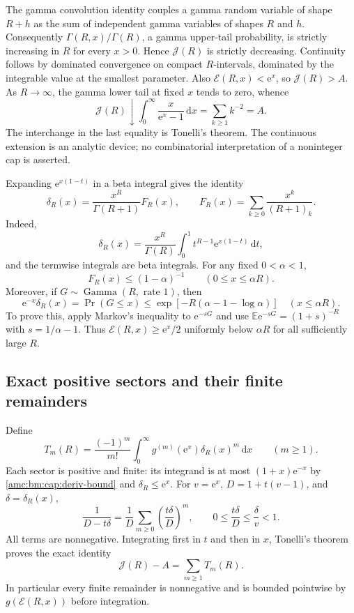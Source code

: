 \documentclass[11pt,letterpaper]{article}
\theoremstyle{remark}\newtheorem{remark}[theorem]{Remark}
\newcommand{\ee}{\mathrm e}
\newcommand{\dd}{\,\mathrm d}
\DeclareMathOperator{\GammaDist}{Gamma}
\begin{document}
The gamma convolution identity couples a gamma random variable of shape $R+h$ as the sum of independent gamma variables of shapes $R$ and $h$. Consequently $\Gamma(R,x)/\Gamma(R)$, a gamma upper-tail probability, is strictly increasing in $R$ for every $x>0$. Hence $\mathcal J(R)$ is strictly decreasing. Continuity follows by dominated convergence on compact $R$-intervals, dominated by the integrable value at the smallest parameter. Also $\mathcal E(R,x)<\ee^x$, so $\mathcal J(R)>A$. As $R\to\infty$, the gamma lower tail at fixed $x$ tends to zero, whence
\[
 \mathcal J(R)\downarrow\int_0^\infty\frac{x}{\ee^x-1}\dd x
 =\sum_{k\ge1}k^{-2}=A.
\]
The interchange in the last equality is Tonelli's theorem. The continuous extension is an analytic device; no combinatorial interpretation of a noninteger cap is asserted.

Expanding $\ee^{x(1-t)}$ in a beta integral gives the identity
\begin{equation}\label{amc:bm:cap:F-factor}
 \delta_R(x)=\frac{x^R}{\Gamma(R+1)}F_R(x),\qquad
 F_R(x)=\sum_{k\ge0}\frac{x^k}{(R+1)_k}.
\end{equation}
Indeed,
\[
 \delta_R(x)=\frac{x^R}{\Gamma(R)}\int_0^1t^{R-1}\ee^{x(1-t)}\dd t,
\]
and the termwise integrals are beta integrals. For any fixed $0<\alpha<1$,
\begin{equation}\label{amc:bm:cap:F-bound}
 F_R(x)\le(1-\alpha)^{-1}\qquad(0\le x\le\alpha R).
\end{equation}
Moreover, if $G\sim\GammaDist(R,\text{ rate }1)$, then
\begin{equation}\label{amc:bm:cap:gamma-lower}
 \ee^{-x}\delta_R(x)=\Pr(G\le x)
 \le\exp[-R(\alpha-1-\log\alpha)]\quad(x\le\alpha R).
\end{equation}
To prove this, apply Markov's inequality to $\ee^{-sG}$ and use
$\mathbb E\ee^{-sG}=(1+s)^{-R}$ with $s=1/\alpha-1$. Thus $\mathcal E(R,x)\ge\ee^x/2$ uniformly below $\alpha R$ for all sufficiently large $R$.

\subsection{Exact positive sectors and their finite remainders}
Define
\begin{equation}\label{amc:bm:cap:T-def}
 T_m(R)=\frac{(-1)^m}{m!}\int_0^\infty
 g^{(m)}(\ee^x)\delta_R(x)^m\dd x\qquad(m\ge1).
\end{equation}
Each sector is positive and finite: its integrand is at most $(1+x)\ee^{-x}$ by \eqref{amc:bm:cap:deriv-bound} and $\delta_R\le\ee^x$.
For $v=\ee^x$, $D=1+t(v-1)$, and $\delta=\delta_R(x)$,
\[
 \frac1{D-t\delta}=\frac1D\sum_{m\ge0}\left(\frac{t\delta}{D}\right)^m,
 \qquad 0\le\frac{t\delta}{D}\le\frac\delta v<1.
\]
All terms are nonnegative. Integrating first in $t$ and then in $x$, Tonelli's theorem proves the exact identity
\begin{equation}\label{amc:bm:cap:positive-series}
 \mathcal J(R)-A=\sum_{m\ge1}T_m(R).
\end{equation}
In particular every finite remainder is nonnegative and is bounded pointwise by $g(\mathcal E(R,x))$ before integration.
\end{document}
